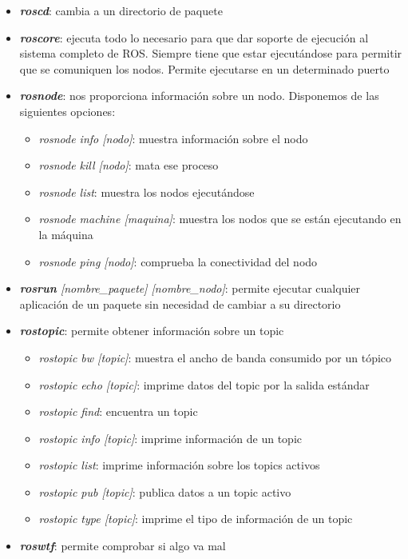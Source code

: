 	\begin{itemize}
		\item \emph{\textbf{roscd}}: cambia a un directorio de paquete
		\item \emph{\textbf{roscore}}: ejecuta todo lo necesario para que dar soporte de ejecución al sistema completo de ROS. Siempre tiene que estar ejecutándose para permitir que se comuniquen los nodos. Permite ejecutarse en un determinado puerto
		\item \emph{\textbf{rosnode}}: nos proporciona información sobre un nodo. Disponemos de las siguientes opciones:
		\begin{itemize}
			\item \textit{rosnode info [nodo]}: muestra información sobre el nodo
			\item \textit{rosnode kill [nodo]}: mata ese proceso
			\item \textit{rosnode list}: muestra los nodos ejecutándose
			\item \textit{rosnode machine [maquina]}: muestra los nodos que se están ejecutando en la máquina
			\item \textit{rosnode ping [nodo]}: comprueba la conectividad del nodo
		\end{itemize}
		\item \emph{\textbf{rosrun} [nombre\_paquete] [nombre\_nodo]}: permite ejecutar cualquier aplicación de un paquete sin necesidad de cambiar a su directorio
		\item \emph{\textbf{rostopic}}: permite obtener información sobre un topic
		\begin{itemize}
			\item \textit{rostopic bw [topic]}: muestra el ancho de banda consumido por un tópico
			\item \textit{rostopic echo [topic]}: imprime datos del topic por la salida estándar
			\item \textit{rostopic find}: encuentra un topic
			\item \textit{rostopic info [topic]}: imprime información de un topic
			\item \textit{rostopic list}: imprime información sobre los topics activos
			\item \textit{rostopic pub [topic]}: publica datos a un topic activo
			\item \textit{rostopic type [topic]}: imprime el tipo de información de un topic
		\end{itemize}
		\item \emph{\textbf{roswtf}}: permite comprobar si algo va mal
	\end{itemize}
	
